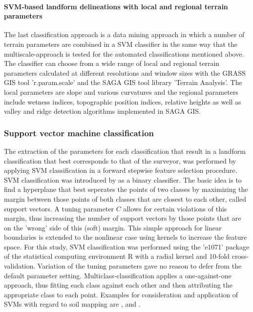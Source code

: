 \documentclass[preprint,12pt,authoryear]{elsarticle}
\begin{document}
\paragraph{SVM-based landform delineations with local and regional terrain parameters}
The last classification approach is a data mining approach in which a number of terrain parameters are combined in a SVM classifier in the same way that the multiscale-approach is tested for the automated classifications mentioned above. The classifier can choose from a wide range of local and regional terrain parameters calculated at different resolutions and window sizes with the GRASS GIS tool 'r.param.scale' and the SAGA GIS tool library 'Terrain Analysis'. The local parameters are slope and various curvatures and the regional parameters include wetness indices, topographic position indices, relative heights as well as valley and ridge detection algorithms implemented in SAGA GIS.  
\subsubsection{Support vector machine classification}
The extraction of the parameters for each classification that result in a landform classification that best corresponds to that of the surveyor, was performed by applying SVM classification in a forward stepwise feature selection procedure. SVM classification was introduced by \cite{Cortes1995} as a binary classifier. The basic idea is to find a hyperplane that best seperates the points of two classes by maximizing the margin between those points of both classes that are closest to each other, called support vectors. A tuning parameter $C$ allows for certain violations of this margin, thus increasing the number of support vectors by those points that are on the 'wrong' side of this (soft) margin. This simple approach for linear boundaries is extended to the nonlinear case using kernels to increase the feature space. For this study, SVM classification was performed using the 'e1071' package \citep{meyer2014} of the statistical computing environment R \citep{cran2014} with a radial kernel and 10-fold cross-validation. Variation of the tuning parameters gave  no reason to defer from the default parameter setting. Multiclass-classification applies a one-against-one approach, thus fitting each class against each other and then attributing the appropriate class to each point. Examples for consideration and application of SVMs with regard to soil mapping are \cite{Ballabio2009}, \cite{Behrens2006} and \cite{Rossel2010}.
\end{document}
